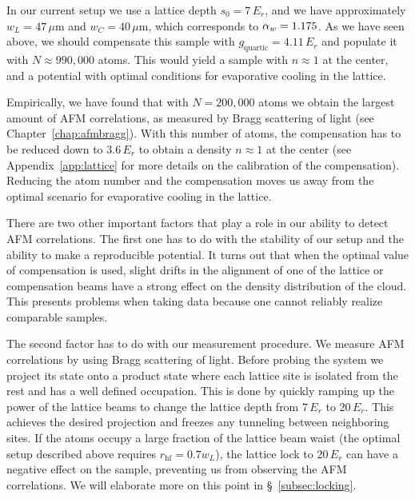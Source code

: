 In our current setup we use a lattice depth $s_{0}=7\,E_{r}$, and we have
approximately $w_{L}=47\,\mu$m and $w_{C}=40\,\mu$m,  which corresponds to
$ \alpha_{w} =1.175$.   As we have seen above, we should compensate this sample with
$g_{\text{quartic}} = 4.11\,E_{r}$ and populate it with $N\approx 990,000$
atoms.  This would yield a sample with $n\approx1$ at the center, and a
potential with optimal conditions for evaporative cooling in the lattice.   

Empirically, we have found that with $N=200,000$ atoms we obtain the largest
amount of AFM correlations, as measured by Bragg scattering of light (see
Chapter~\ref{chap:afmbragg}).  With this number of atoms, the compensation has
to be reduced down to $3.6\,E_{r}$ to obtain a density $n\approx1$ at the
center (see Appendix~\ref{app:lattice} for more details on the calibration of
the compensation).  Reducing the atom number and the compensation moves us away
from the optimal scenario for evaporative cooling in the lattice. 

There are two other important factors that play a role in our ability to detect
AFM correlations.  The first one has to do with the stability of our setup and
the ability to make a reproducible potential.   It turns out that when the
optimal value of compensation is used, slight drifts in the alignment of one of
the lattice or compensation beams have a strong effect on the density
distribution of the cloud.  This presents problems when taking data because one
cannot reliably realize comparable samples.  

The second factor has to do with our measurement procedure.   We measure AFM
correlations by using Bragg scattering of light.  Before probing the system we
project its state onto a product state where each lattice site is isolated from
the rest and has a well defined occupation.  This is done by quickly ramping up
the power of the lattice beams to change the lattice depth from $7\,E_{r}$ to
20$\,E_{r}$.   This achieves the desired projection and freezes any tunneling
between neighboring sites.  If the atoms occupy a large fraction of the lattice
beam waist (the optimal setup described above requires
$r_{\mathrm{hf}}=0.7w_{L}$), the lattice lock to 20\,$E_{r}$ can have a
negative effect on the sample, preventing us from observing the AFM
correlations.  We will elaborate more on this point in \S~\ref{subsec:locking}.

